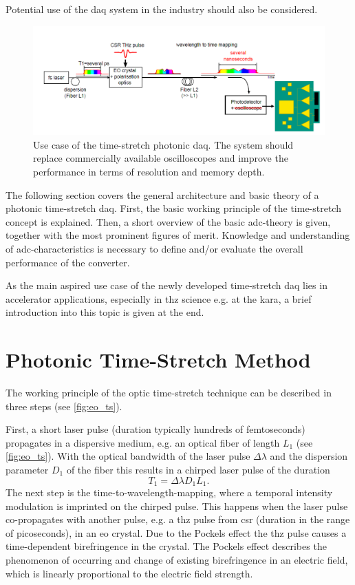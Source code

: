 Potential use of the \gls{daq} system in the industry should also be considered.

\begin{figure}[tbh]
	\centering
	\includegraphics[width=\textwidth]{chap/02-theory/img/motivation}
	\caption[Use case of the new system]{Use case of the time-stretch photonic \gls{daq}. The system should replace commercially available oscilloscopes and improve the performance in terms of resolution and memory depth.}
	\label{fig:motivation}
\end{figure}


The following section covers the general architecture and basic theory of a photonic time-stretch \gls{daq}.
First, the basic working principle of the time-stretch concept is explained.
Then, a short overview of the basic \gls{adc}-theory is given, together with the most prominent figures of merit. 
Knowledge and understanding of \gls{adc}-characteristics is necessary to define and/or evaluate the overall performance of the converter. 

As the main aspired use case of the newly developed time-stretch \gls{daq} lies in accelerator applications, especially in \gls{thz} science e.g. at the \gls{kara}, a brief introduction into this topic is given at the end.

\glsresetall

\section{Photonic Time-Stretch Method}
The working principle of the optic time-stretch technique can be described in three steps (see \autoref{fig:eo_ts}).

First, a short laser pulse (duration typically hundreds of femtoseconds) propagates in a dispersive medium, e.g. an optical fiber of length $L_1$ (see \autoref{fig:eo_ts}).
With the optical bandwidth of the laser pulse $\Delta \lambda$ and the dispersion parameter $D_1$ of the fiber this results in a chirped laser pulse of the duration
\begin{equation}
	T_1 = \Delta \lambda D_1 L_1.
\end{equation}
The next step is the time-to-wavelength-mapping, where a temporal intensity modulation is imprinted on the chirped pulse.
This happens when the laser pulse co-propagates with another pulse, e.g. a \gls{thz} pulse from \gls{csr} (duration in the range of picoseconds), in an \gls{eo} crystal. 
Due to the Pockels effect the \gls{thz} pulse causes a time-dependent birefringence in the crystal. 
The Pockels effect describes the phenomenon of occurring and change of existing birefringence in an electric field, which is linearly proportional to the electric field strength.\cite{pockels} 

